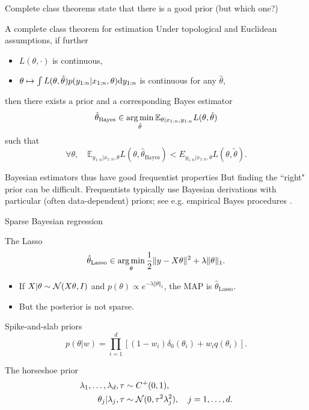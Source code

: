 \documentclass[10pt]{beamer}
\begin{document}
\begin{frame}{Complete class theorems state that there is a good prior (but which one?)}

\begin{block}{A complete class theorem for estimation \citep{Ber85}}
Under topological and Euclidean assumptions, if further \begin{itemize}
\item $L(\theta,\cdot)$ is continuous,
\item $\theta\mapsto \int L(\theta,\hat\theta)p(y_{1:n} \vert x_{1:n}, \theta){\rm d} y_{1:n}$ is continuous for any $\hat\theta$,
\end{itemize}
then  there exists a prior and a corresponding Bayes estimator
$$
\hat\theta_{\text{Bayes}} \in \operatorname*{arg\,min}_{\hat\theta} \mathbb{E}_{\theta\vert x_{1:n},y_{1:n}} L(\theta,\hat\theta)
$$
such that
$$ \forall \theta, \quad \mathbb E_{y_{1:n}\vert x_{1:n},\theta} L(\theta,\hat\theta_{\text{Bayes}}) < E_{y_{1:n}\vert x_{1:n},\theta} L(\theta,\tilde\theta).$$
\end{block}
\begin{alertblock}{Bayesian estimators thus have good frequentist properties}
But finding the ``right" prior can be difficult. Frequentists typically use Bayesian derivations with particular (often data-dependent) priors; see e.g. empirical Bayes procedures \citep{Efr10}.
\end{alertblock}
\end{frame}

\begin{frame}{Sparse Bayesian regression}
\begin{block}{The Lasso}
$$ 
\hat\theta_{\text{Lasso}} \in \operatorname*{arg\,min}_\theta \frac12 \Vert y -X\theta\Vert^2 + \lambda \Vert \theta\Vert_1.
$$
\end{block}
\begin{itemize}
\item If $X\vert\theta \sim \mathcal{N}(X\theta, I)$ and $p(\theta) \propto e^{-\lambda\Vert \theta\Vert_1}$, the MAP is $\hat\theta_{\text{Lasso}}$.
\item But the posterior is not sparse.
\end{itemize}
\begin{block}{Spike-and-slab priors}
  \vspace{-5pt}
  $$
    p(\theta\vert w) = \prod_{i=1}^d \left[(1-w_i)\delta_0(\theta_i) + w_i q(\theta_i)\right].
  $$
\end{block}

\begin{block}{The horseshoe prior \citep{CaPoSc10}}
  \vspace{-15pt}
  \begin{align*}
    \lambda_1, \dots, \lambda_d, \tau & \sim C^+(0,1), \\
    \theta_j\vert \lambda_j, \tau &\sim \mathcal{N}(0, \tau^2 \lambda_j^2), \quad j=1,\dots, d.
  \end{align*}
\end{block}
\end{frame}
\end{document}
